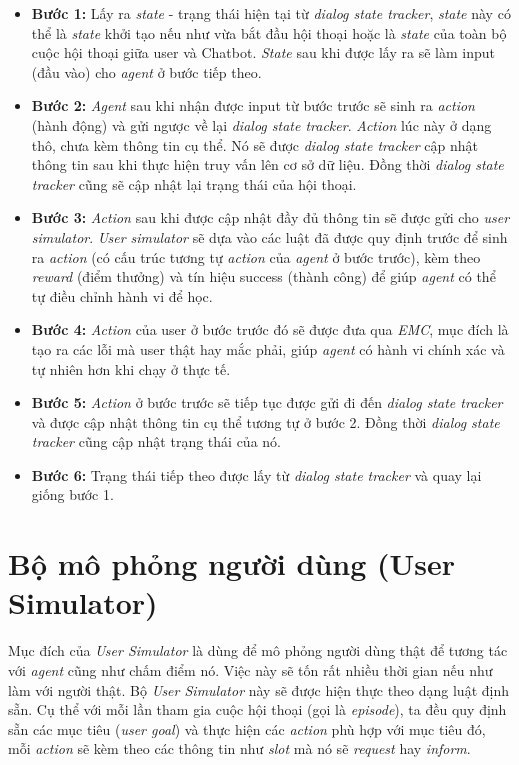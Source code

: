 \begin{itemize}
    \item \textbf{Bước 1:} Lấy ra \textit{state} - trạng thái hiện tại
    từ \textit{dialog state tracker}, \textit{state} này có thể là
    \textit{state} khởi tạo nếu như vừa bắt đầu hội thoại hoặc là
    \textit{state} của toàn bộ cuộc hội thoại giữa user và Chatbot.
    \textit{State} sau khi được lấy ra sẽ làm input (đầu vào) cho
    \textit{agent} ở bước tiếp theo.
    \item \textbf{Bước 2:} \textit{Agent} sau khi nhận được input
    từ bước trước sẽ sinh ra \textit{action} (hành động) và gửi
    ngược về lại \textit{dialog state tracker}. \textit{Action}
    lúc này ở dạng thô, chưa kèm thông tin cụ thể. Nó sẽ được
    \textit{dialog state tracker} cập nhật thông tin sau khi thực hiện
    truy vấn lên cơ sở dữ liệu. Đồng thời \textit{dialog state tracker}
    cũng sẽ cập nhật lại trạng thái của hội thoại.
    \item \textbf{Bước 3:} \textit{Action} sau khi được cập nhật đầy đủ
    thông tin sẽ được gửi cho \textit{user simulator}.
    \textit{User simulator} sẽ dựa vào các luật đã được quy định trước
    để sinh ra \textit{action} (có cấu trúc tương tự \textit{action}
    của \textit{agent} ở bước trước), kèm theo \textit{reward} (điểm thưởng)
    và tín hiệu success (thành công) để giúp \textit{agent} có thể
    tự điều chỉnh hành vi để học.
    \item \textbf{Bước 4:} \textit{Action} của user ở bước trước đó
    sẽ được đưa qua \textit{EMC}, mục đích là tạo ra các lỗi mà
    user thật hay mắc phải, giúp \textit{agent} có hành vi chính xác
    và tự nhiên hơn khi chạy ở thực tế.
    \item \textbf{Bước 5:} \textit{Action} ở bước trước sẽ tiếp tục
    được gửi đi đến \textit{dialog state tracker} và được cập nhật
    thông tin cụ thể tương tự ở bước 2. Đồng thời
    \textit{dialog state tracker} cũng cập nhật trạng thái của nó.
    \item \textbf{Bước 6:} Trạng thái tiếp theo được lấy từ
    \textit{dialog state tracker} và quay lại giống bước 1.
\end{itemize}

\section{Bộ mô phỏng người dùng (User Simulator)}
Mục đích của \textit{User Simulator} là dùng để mô phỏng người dùng
thật để tương tác với \textit{agent} cũng như chấm điểm nó.
Việc này sẽ tốn rất nhiều thời gian nếu như làm với người thật.
Bộ \textit{User Simulator} này sẽ được hiện thực theo dạng
luật định sẵn. Cụ thể với mỗi lần tham gia cuộc hội thoại
(gọi là \textit{episode}), ta đều quy định sẵn các mục tiêu
(\textit{user goal}) và thực hiện các \textit{action} phù hợp với
mục tiêu đó, mỗi \textit{action} sẽ kèm theo các thông tin như
\textit{slot} mà nó sẽ \textit{request} hay \textit{inform}.

